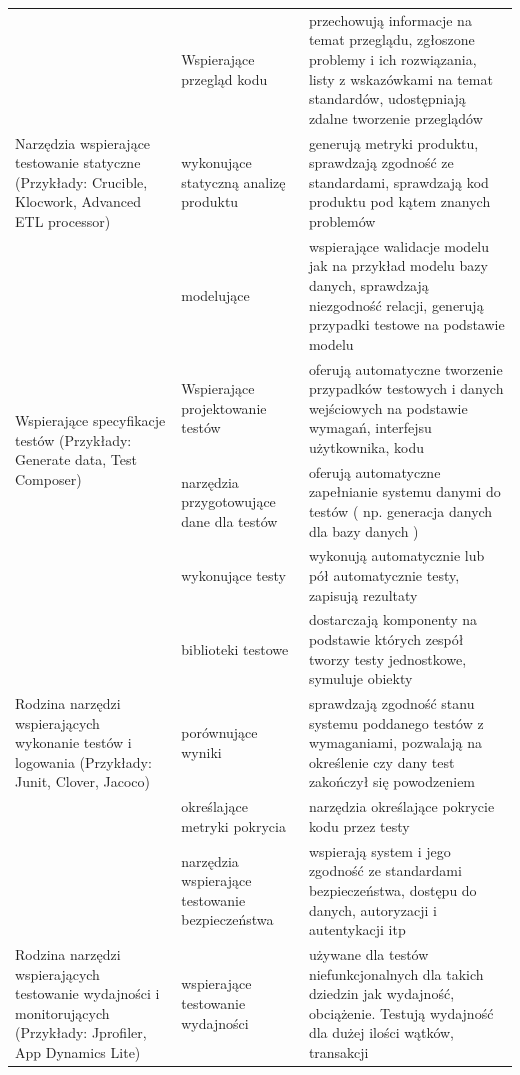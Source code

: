 \begin{longtable}{| p{4cm} | p{4cm} | p{8cm} |}
\multirow{3}{4cm}{Narzędzia wspierające testowanie statyczne (Przykłady: Crucible\cite{crucible}, Klocwork\cite{klocwork}, Advanced ETL processor\cite{etlProcessor})} &
Wspierające przegląd kodu & przechowują informacje na temat przeglądu, zgłoszone problemy i ich rozwiązania, listy z wskazówkami na temat standardów, udostępniają zdalne tworzenie przeglądów\\ \cline{2-3}
& wykonujące statyczną analizę produktu & generują metryki produktu, sprawdzają zgodność ze standardami, sprawdzają kod produktu pod kątem znanych problemów\\ \cline{2-3}
&  modelujące  & wspierające walidacje modelu jak na przykład modelu bazy danych, sprawdzają niezgodność relacji, generują przypadki testowe na podstawie modelu\\ \hline
\hline
\multirow{2}{4cm}{Wspierające specyfikacje testów (Przykłady: Generate data\cite{generateData}, Test Composer\cite{testComposer})} &
Wspierające projektowanie testów & oferują automatyczne tworzenie przypadków testowych i danych wejściowych na podstawie wymagań, interfejsu użytkownika, kodu\\ \cline{2-3}
& narzędzia przygotowujące dane dla testów & oferują automatyczne zapełnianie systemu danymi do testów ( np. generacja danych dla bazy danych )\\ \cline{2-3}
\hline
\multirow{5}{4cm}{Rodzina narzędzi wspierających wykonanie testów i logowania (Przykłady: Junit\cite{junit}, Clover\cite{clover}, Jacoco\cite{jacoco})} &
wykonujące testy & wykonują automatycznie lub pół automatycznie testy, zapisują rezultaty\\ \cline{2-3}
& biblioteki testowe & dostarczają komponenty na podstawie których zespół tworzy testy jednostkowe, symuluje obiekty\\ \cline{2-3}
&  porównujące wyniki & sprawdzają zgodność stanu systemu poddanego testów z wymaganiami, pozwalają na określenie czy dany test zakończył się powodzeniem\\ \cline{2-3}
& określające metryki pokrycia & narzędzia określające pokrycie kodu przez testy \\ \cline{2-3}
& narzędzia wspierające testowanie bezpieczeństwa & wspierają system i jego zgodność ze standardami bezpieczeństwa, dostępu do danych, autoryzacji i autentykacji itp\\ \hline
\hline
\multirow{5}{4cm}{Rodzina narzędzi wspierających testowanie wydajności i monitorujących (Przykłady: Jprofiler\cite{jprofiler}, App Dynamics Lite\cite{appdynamic})}&
 wspierające testowanie wydajności & używane dla testów niefunkcjonalnych dla takich dziedzin jak wydajność, obciążenie. Testują wydajność dla dużej ilości wątków, transakcji \\ \cline{2-3}

\end{longtable}
